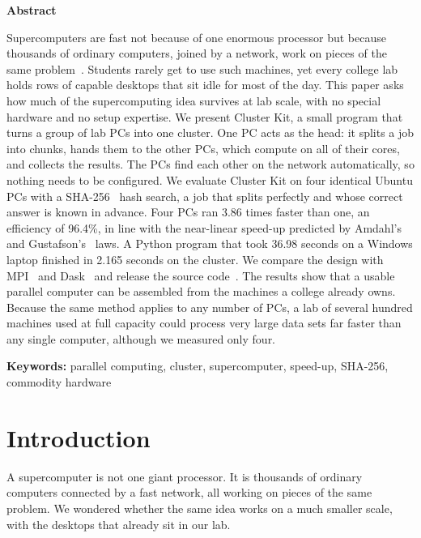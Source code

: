\documentclass[11pt,a4paper]{article}
\let\oldsection\section
\renewcommand{\section}{\Needspace{6\baselineskip}\oldsection}
\begin{document}
{\Large\bfseries\color{hblue}Abstract}\par\smallskip
Supercomputers are fast not because of one enormous processor but because thousands of ordinary computers, joined by a network, work on pieces of the same problem~\cite{amdahl,mpi}. Students rarely get to use such machines, yet every college lab holds rows of capable desktops that sit idle for most of the day. This paper asks how much of the supercomputing idea survives at lab scale, with no special hardware and no setup expertise. We present Cluster Kit, a small program that turns a group of lab PCs into one cluster. One PC acts as the head: it splits a job into chunks, hands them to the other PCs, which compute on all of their cores, and collects the results. The PCs find each other on the network automatically, so nothing needs to be configured. We evaluate Cluster Kit on four identical Ubuntu PCs with a SHA-256~\cite{fips} hash search, a job that splits perfectly and whose correct answer is known in advance. Four PCs ran 3.86 times faster than one, an efficiency of 96.4\%, in line with the near-linear speed-up predicted by Amdahl's~\cite{amdahl} and Gustafson's~\cite{gustafson} laws. A Python program that took 36.98 seconds on a Windows laptop finished in 2.165 seconds on the cluster. We compare the design with MPI~\cite{mpi} and Dask~\cite{dask} and release the source code~\cite{repo}. The results show that a usable parallel computer can be assembled from the machines a college already owns. Because the same method applies to any number of PCs, a lab of several hundred machines used at full capacity could process very large data sets far faster than any single computer, although we measured only four.

\smallskip
\noindent\textbf{\color{hblue}Keywords:} parallel computing, cluster, supercomputer, speed-up, SHA-256, commodity hardware

\bigskip
\begingroup\setcounter{tocdepth}{1}\renewcommand{\contentsname}{\large Contents}
\makeatletter\renewcommand{\l@section}[2]{\@dottedtocline{1}{0em}{1.6em}{#1}{#2}}\makeatother
\setlength{\parskip}{0pt}\tableofcontents\endgroup


\newpage
\section{Introduction}
A supercomputer is not one giant processor. It is thousands of ordinary computers connected by a fast network, all working on pieces of the same problem. We wondered whether the same idea works on a much smaller scale, with the desktops that already sit in our lab.
\end{document}
